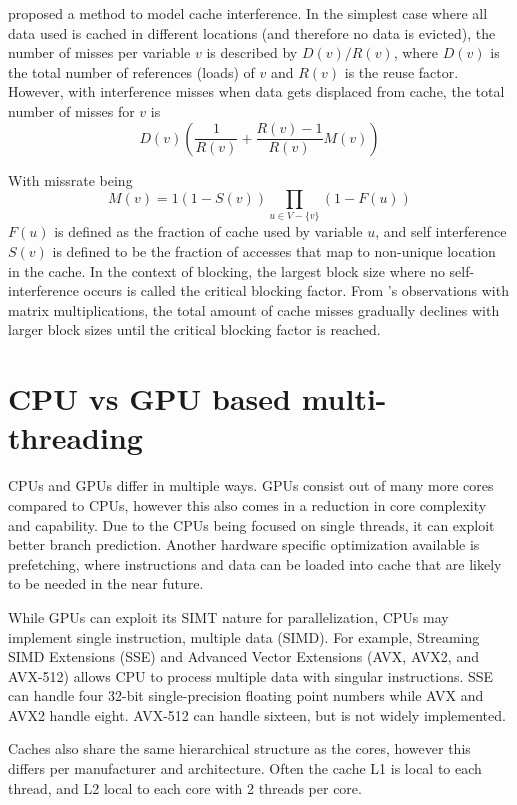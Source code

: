 \citeauthor{lam1991cache} proposed a method to model cache interference.
In the simplest case where all data used is cached in different locations (and therefore no data is evicted), the number of misses per variable $v$ is described by $D(v)/R(v)$, where $D(v)$ is the total number of references (loads) of $v$ and $R(v)$ is the reuse factor.
However, with interference misses when data gets displaced from cache, the total number of misses for $v$ is
\[
    D(v)\left(\frac{1}{R(v)}+\frac{R(v)-1}{R(v)}M(v)\right)
\]

With missrate being
\[
    M(v) = 1 \left(1 - S(v)\right) \prod_{u\in V - \{v\}}\left(1 - F(u)\right)
\]
$F(u)$ is defined as the fraction of cache used by variable $u$, and self interference $S(v)$ is defined to be the fraction of accesses that map to non-unique location in the cache.
In the context of blocking, the largest block size where no self-interference occurs is called the critical blocking factor.
From \citeauthor{lam1991cache}'s observations with matrix multiplications, the total amount of cache misses gradually declines with larger block sizes until the critical blocking factor is reached.

\section{CPU vs GPU based multi-threading}
CPUs and GPUs differ in multiple ways.
GPUs consist out of many more cores compared to CPUs, however this also comes in a reduction in core complexity and capability.
Due to the CPUs being focused on single threads, it can exploit better branch prediction.
Another hardware specific optimization available is prefetching, where instructions and data can be loaded into cache that are likely to be needed in the near future.

While GPUs can exploit its SIMT nature for parallelization, CPUs may implement single instruction, multiple data (SIMD). For example, Streaming SIMD Extensions (SSE) and Advanced Vector Extensions (AVX, AVX2, and AVX-512) allows CPU to process multiple data with singular instructions.
SSE can handle four 32-bit single-precision floating point numbers while AVX and AVX2 handle eight.
AVX-512 can handle sixteen, but is not widely implemented.

Caches also share the same hierarchical structure as the cores, however this differs per manufacturer and architecture.
Often the cache L1 is local to each thread, and L2 local to each core with 2 threads per core.

